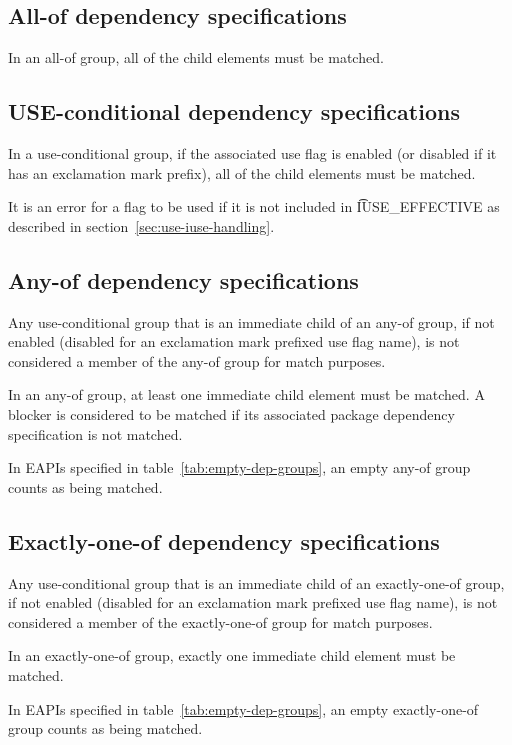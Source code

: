 \subsection{All-of dependency specifications}

In an all-of group, all of the child elements must be matched.

\subsection{USE-conditional dependency specifications}

In a use-conditional group, if the associated use flag is enabled (or disabled if it has an
exclamation mark prefix), all of the child elements must be matched.

It is an error for a flag to be used if it is not included in \t{IUSE_EFFECTIVE} as described in
section~\ref{sec:use-iuse-handling}.

\subsection{Any-of dependency specifications}

Any use-conditional group that is an immediate child of an any-of group, if not enabled (disabled
for an exclamation mark prefixed use flag name), is not considered a member of the any-of group
for match purposes.

In an any-of group, at least one immediate child element must be matched. A blocker is
considered to be matched if its associated package dependency specification is not matched.

 In EAPIs specified in table~\ref{tab:empty-dep-groups}, an empty
any-of group counts as being matched.

\subsection{Exactly-one-of dependency specifications}

Any use-conditional group that is an immediate child of an exactly-one-of group, if not enabled
(disabled for an exclamation mark prefixed use flag name), is not considered a member of the
exactly-one-of group for match purposes.

In an exactly-one-of group, exactly one immediate child element must be matched.

In EAPIs specified in table~\ref{tab:empty-dep-groups}, an empty exactly-one-of group counts as
being matched.

